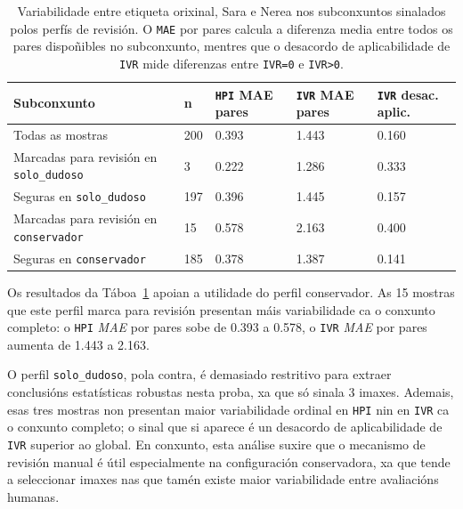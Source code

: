 {
\begin{table}[htbp]
    \centering
    \scriptsize
    \setlength{\tabcolsep}{3pt}
    \begin{tabular}{p{}|p{}|p{}|p{}|p{}}
        \rowcolor{udcpink!25}
        \textbf{Subconxunto} & \textbf{n} & \textbf{\texttt{HPI} MAE pares} & \textbf{\texttt{IVR} MAE pares} & \textbf{\texttt{IVR} desac. aplic.} \\\hline
        Todas as mostras & 200 & 0.393 & 1.443 & 0.160 \\
        Marcadas para revisión en \texttt{solo\_dudoso} & 3 & 0.222 & 1.286 & 0.333 \\
        Seguras en \texttt{solo\_dudoso} & 197 & 0.396 & 1.445 & 0.157 \\
        Marcadas para revisión en \texttt{conservador} & 15 & 0.578 & 2.163 & 0.400 \\
        Seguras en \texttt{conservador} & 185 & 0.378 & 1.387 & 0.141 \\
    \end{tabular}
    \caption{Variabilidade entre etiqueta orixinal, Sara e Nerea nos subconxuntos sinalados polos perfís de revisión. O \texttt{MAE} por pares calcula a diferenza media entre todos os pares dispoñibles no subconxunto, mentres que o desacordo de aplicabilidade de \texttt{IVR} mide diferenzas entre \texttt{IVR=0} e \texttt{IVR>0}.}
    \label{tab:peer-review-flags}
\end{table}
}

Os resultados da Táboa~\ref{tab:peer-review-flags} apoian a utilidade do perfil conservador. As 15
mostras que este perfil marca para revisión presentan máis variabilidade ca o conxunto completo:
o \texttt{HPI} \textit{MAE} por pares sobe de 0.393 a 0.578, o \texttt{IVR} \textit{MAE} por pares aumenta de 1.443 a
2.163.

O perfil \texttt{solo\_dudoso}, pola contra, é demasiado restritivo para extraer conclusións
estatísticas robustas nesta proba, xa que só sinala 3 imaxes. Ademais, esas tres mostras non
presentan maior variabilidade ordinal en \texttt{HPI} nin en \texttt{IVR} ca o conxunto completo;
o sinal que si aparece é un desacordo de aplicabilidade de \texttt{IVR} superior ao global. En
conxunto, esta análise suxire que o mecanismo de revisión manual é útil especialmente na
configuración conservadora, xa que tende a seleccionar imaxes nas que tamén existe maior
variabilidade entre avaliacións humanas.


